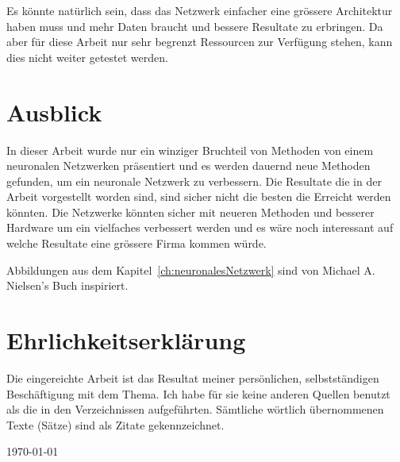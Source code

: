 \documentclass[12pt,a4paper]{report}
\begin{document}
Es könnte natürlich sein, dass das Netzwerk einfacher eine grössere Architektur haben muss und mehr Daten braucht und bessere Resultate zu erbringen.
Da aber für diese Arbeit nur sehr begrenzt Ressourcen zur Verfügung stehen, kann dies nicht weiter getestet werden.


\chapter{Ausblick}
In dieser Arbeit wurde nur ein winziger Bruchteil von Methoden von einem neuronalen Netzwerken präsentiert und es werden dauernd
neue Methoden gefunden, um ein neuronale Netzwerk zu verbessern.
Die Resultate die in der Arbeit vorgestellt worden sind, sind sicher nicht die besten die Erreicht werden könnten.
Die Netzwerke könnten sicher mit neueren Methoden und besserer Hardware um ein vielfaches verbessert werden und
es wäre noch interessant auf welche Resultate eine grössere Firma kommen würde.



\clearpage
{}
{}
\nocite{*}



\clearpage
{}
{}
\listoffigures
Abbildungen aus dem Kapitel~\ref{ch:neuronalesNetzwerk} sind von Michael A. Nielsen's Buch\cite{neuralbook} inspiriert.

\appendix


\chapter*{Ehrlichkeitserklärung}

Die eingereichte Arbeit ist das Resultat meiner persönlichen, selbstständigen Beschäftigung mit dem Thema.
Ich habe für sie keine anderen Quellen benutzt als die in den Verzeichnissen aufgeführten.
Sämtliche wörtlich übernommenen Texte (Sätze) sind als Zitate gekennzeichnet.

\vspace{2cm}
\today
\end{document}
